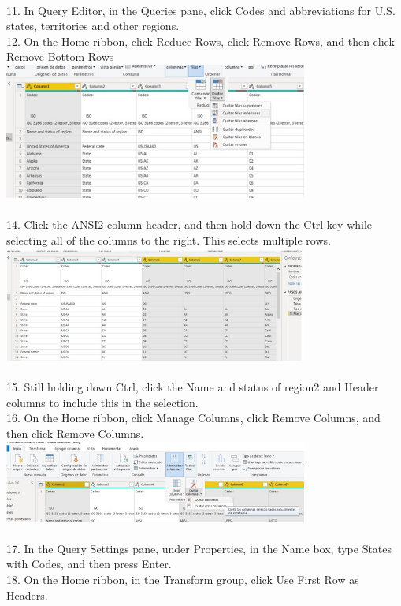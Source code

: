 \documentclass[preprint,12pt]{elsarticle}
\begin{document}
\begin{itemize}
		 		\\ 11. In Query Editor, in the Queries pane, click Codes and abbreviations for U.S. states, territories and other
		 		regions.
		 		\\ 12. On the Home ribbon, click Reduce Rows, click Remove Rows, and then click Remove Bottom Rows
		 		\\ \includegraphics[width=10cm]{./IMAGENES/3.12} \\
		 		\\ 14. Click the ANSI2 column header, and then hold down the Ctrl key while selecting all of the columns to the
		 		right. This selects multiple rows.
		 		\\ \includegraphics[width=10cm]{./IMAGENES/3.14} \\
		 		\\ 15. Still holding down Ctrl, click the Name and status of region2 and Header columns to include this in the
		 		selection.
		 		\\ 16. On the Home ribbon, click Manage Columns, click Remove Columns, and then click Remove Columns.
		 		\\ \includegraphics[width=10cm]{./IMAGENES/3.16} \\
		 		\\ 17. In the Query Settings pane, under Properties, in the Name box, type States with Codes, and then press
		 		Enter.
		 		\\ 18. On the Home ribbon, in the Transform group, click Use First Row as Headers.

\end{itemize}
\end{document}
